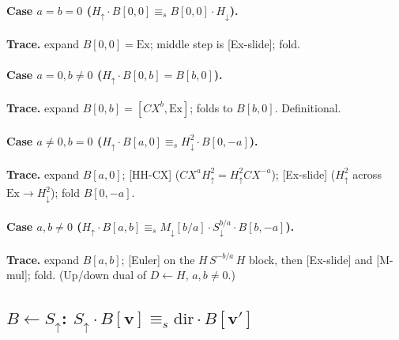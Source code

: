 \documentclass[a4paper]{article}
\newcommand{\lem}[1]{\textsf{[#1]}}      %
\begin{document}
\paragraph{Case $a=b=0$ \;($H_\uparrow\cdot B[0,0]\equiv_s B[0,0]\cdot H_\downarrow$).}
\begin{center}\end{center}
\textbf{Trace.} expand $B[0,0]=\mathrm{Ex}$; middle step is \lem{Ex-slide}; fold.

\paragraph{Case $a=0,b\neq0$ \;($H_\uparrow\cdot B[0,b]=B[b,0]$).}
\begin{center}\end{center}
\textbf{Trace.} expand $B[0,b]=[CX^b,\mathrm{Ex}]$; folds to $B[b,0]$. Definitional.

\paragraph{Case $a\neq0,b=0$ \;($H_\uparrow\cdot B[a,0]\equiv_s H^2_\downarrow\cdot B[0,-a]$).}
\label{sub:hba0}\begin{center}\end{center}
\textbf{Trace.} expand $B[a,0]$; \lem{HH-CX} ($CX^{a}H^2_\uparrow=H^2_\uparrow CX^{-a}$); \lem{Ex-slide} ($H^2_\uparrow$ across $\mathrm{Ex}\to H^2_\downarrow$); fold $B[0,-a]$.

\paragraph{Case $a,b\neq0$ \;($H_\uparrow\cdot B[a,b]\equiv_s M_\downarrow[b/a]\cdot S^{b/a}_\downarrow\cdot B[b,-a]$).}
\begin{center}\end{center}
\textbf{Trace.} expand $B[a,b]$; \lem{Euler} on the $H\,S^{-b/a}\,H$ block, then \lem{Ex-slide} and \lem{M-mul}; fold. (Up/down dual of $D\leftarrow H$, $a,b\neq0$.)

\subsection{$B\leftarrow S_\uparrow$: \; $S_\uparrow\cdot B[\mathbf v]\equiv_s \mathrm{dir}\cdot B[\mathbf v']$}
\end{document}
